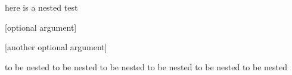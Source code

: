 here is a nested test
\begin{one}

	[optional argument]

	[another optional argument]




	to be nested to be nested
	to be nested to be nested
	to be nested to be nested
\end{one}
